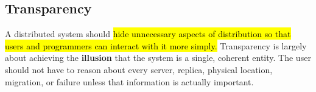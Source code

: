 \subsection{Transparency}\label{subsec:introduction--transparency}

\enlargethispage{\baselineskip}
\renewcommand{\bottomfraction}{0.85}
\renewcommand{\topfraction}{0.85}
\renewcommand{\textfraction}{0.1}

A distributed system should \hl{hide unnecessary aspects of distribution so that users and programmers can interact with it more simply.} Transparency is largely about achieving the \textbf{illusion} that the system is a single, coherent entity. The user should not have to reason about every server, replica, physical location, migration, or failure unless that information is actually important.

\hfill

